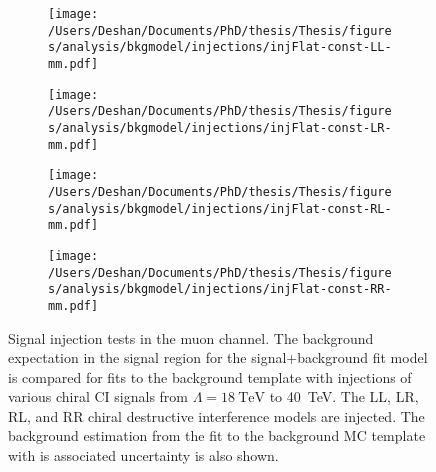 \begin{figure}[h!]
    \centering
    \begin{subfigure}[b]{0.49\textwidth}
        \centering
        \texttt{[image: /Users/Deshan/Documents/PhD/thesis/Thesis/figures/analysis/bkgmodel/injections/injFlat-const-LL-mm.pdf]}
        \label{fig:bkgmodel:injmm1}
    \end{subfigure}
    \begin{subfigure}[b]{0.49\textwidth}
        \centering
        \texttt{[image: /Users/Deshan/Documents/PhD/thesis/Thesis/figures/analysis/bkgmodel/injections/injFlat-const-LR-mm.pdf]}
        \label{fig:bkgmodel:injmm3}
    \end{subfigure}
    \begin{subfigure}[b]{0.49\textwidth}
        \centering
        \texttt{[image: /Users/Deshan/Documents/PhD/thesis/Thesis/figures/analysis/bkgmodel/injections/injFlat-const-RL-mm.pdf]}
        \label{fig:bkgmodel:injmm5}
    \end{subfigure}
    \begin{subfigure}[b]{0.49\textwidth}
        \centering
        \texttt{[image: /Users/Deshan/Documents/PhD/thesis/Thesis/figures/analysis/bkgmodel/injections/injFlat-const-RR-mm.pdf]}
        \label{fig:bkgmodel:injmm7}
    \end{subfigure}
    \caption[Signal injection tests in the muon channel for destructive interference models]{Signal injection tests in the muon channel. The background expectation in the signal region for the signal+background fit model is compared for fits to the background template with injections of various chiral CI signals from $\Lambda = \SI{18}{\tera\electronvolt}$ to \SI{40}{\tera\electronvolt}. The LL, LR, RL, and RR chiral destructive interference models are injected. The background estimation from the fit to the background MC template with is associated uncertainty is also shown.}
    \label{fig:bkgmodel:injmmconst}
\end{figure}

